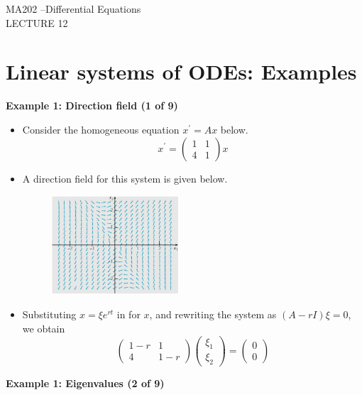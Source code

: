 \documentclass[11pt,a4paper]{article}
\begin{document}
	\begin{center}
		\vspace*{8cm}
		\Huge MA202 –Differential Equations\\
		\LARGE LECTURE 12
  \end{center}
  \newpage
  \section*{Linear systems of ODEs: Examples}
  \textbf{Example 1: Direction field (1 of 9)}
	\begin{itemize}
		\item Consider the homogeneous equation $x^\prime = Ax$ below.
		$$
		x^\prime =
		\begin{pmatrix}
			1 & 1\\
			4 & 1
		\end{pmatrix}x
		$$
		\item A direction field for this system is given below.
		\begin{figure}[H]
			\centering
				\includegraphics[width=0.45\textwidth]{figure/Lec12f1.PNG}
		\end{figure}
		\item Substituting $x = \xi e^{rt}$ in for $x$, and rewriting the system as $(A-rI)\xi=0$, we obtain
		$$
		\begin{pmatrix}
			1 - r & 1\\
			4 & 1-r
		\end{pmatrix}
		\begin{pmatrix}
			\xi_1\\
			\xi_2
		\end{pmatrix}
		=
		\begin{pmatrix}
			0\\
			0
		\end{pmatrix}
		$$
	\end{itemize}
	\textbf{Example 1: Eigenvalues (2 of 9)}
\end{document}
